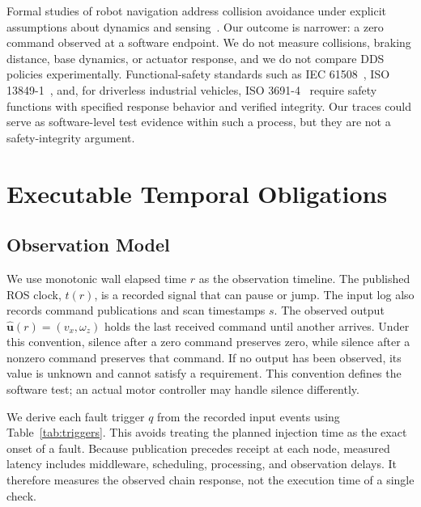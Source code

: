 \documentclass[conference]{IEEEtran}
\begin{document}
Formal studies of robot navigation address collision avoidance under explicit assumptions about dynamics and sensing~\cite{mitsch,phan}. Our outcome is narrower: a zero command observed at a software endpoint. We do not measure collisions, braking distance, base dynamics, or actuator response, and we do not compare DDS policies experimentally. Functional-safety standards such as IEC 61508~\cite{iec61508}, ISO 13849-1~\cite{iso13849}, and, for driverless industrial vehicles, ISO 3691-4~\cite{iso3691} require safety functions with specified response behavior and verified integrity. Our traces could serve as software-level test evidence within such a process, but they are not a safety-integrity argument.

\section{Executable Temporal Obligations}
\subsection{Observation Model}
We use monotonic wall elapsed time $r$ as the observation timeline. The published ROS clock, $t(r)$, is a recorded signal that can pause or jump. The input log also records command publications and scan timestamps $s$. The observed output $\hat{\mathbf{u}}(r)=(v_x,\omega_z)$ holds the last received command until another arrives. Under this convention, silence after a zero command preserves zero, while silence after a nonzero command preserves that command. If no output has been observed, its value is unknown and cannot satisfy a requirement. This convention defines the software test; an actual motor controller may handle silence differently.

We derive each fault trigger $q$ from the recorded input events using Table~\ref{tab:triggers}. This avoids treating the planned injection time as the exact onset of a fault. Because publication precedes receipt at each node, measured latency includes middleware, scheduling, processing, and observation delays. It therefore measures the observed chain response, not the execution time of a single check.
\end{document}
